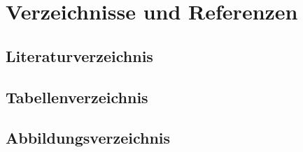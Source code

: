 \chapter{Verzeichnisse und Referenzen}

\section{Literaturverzeichnis}


\section{Tabellenverzeichnis}


\section{Abbildungsverzeichnis}
\listoffigures

